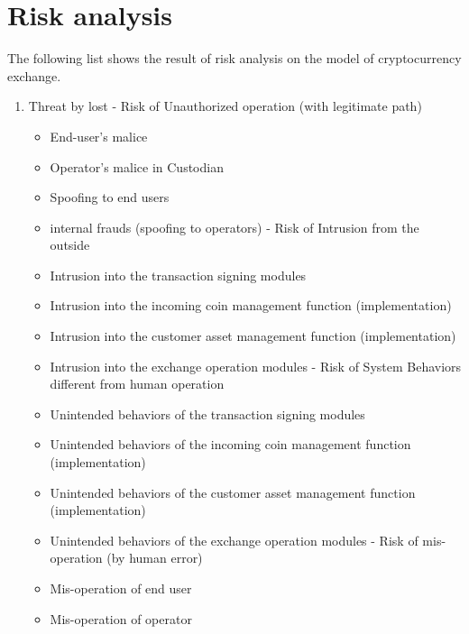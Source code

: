 \section{Risk analysis}
\label{appendix_risks}

The following list shows the result of risk analysis on the
model of cryptocurrency exchange.

\begin{enumerate}
  \item Threat by lost - Risk of Unauthorized operation (with legitimate
         path)
   \begin{itemize}
     \item End-user's malice
     \item Operator's malice in Custodian
     \item Spoofing to end users
     \item internal frauds (spoofing to operators) - Risk of Intrusion from the outside
     \item Intrusion into the transaction signing modules
     \item Intrusion into the incoming coin management function (implementation)
     \item Intrusion into the customer asset management function (implementation)
     \item Intrusion into the exchange operation modules - Risk of System Behaviors different from human operation
     \item Unintended behaviors of the transaction signing modules
     \item Unintended behaviors of the incoming coin management function (implementation)
     \item Unintended behaviors of the customer asset management function (implementation)
     \item Unintended behaviors of the exchange operation modules - Risk of mis-operation (by human error)
     \item Mis-operation of end user
     \item Mis-operation of operator
   \end{itemize}


\end{enumerate}
